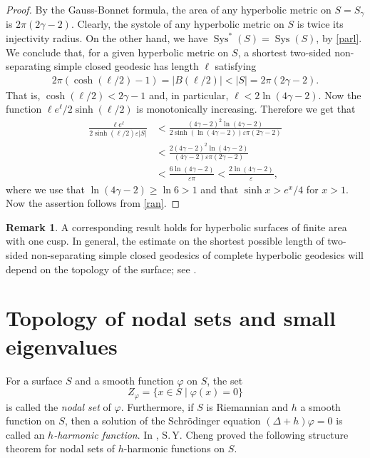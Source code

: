 \documentclass[a4paper,11pt]{amsart}
\numberwithin{equation}{section}
\theoremstyle{definition}
\newtheorem{rem}[equation]{Remark}
\def\ve{\varepsilon}
\def\vf{\varphi}
\DeclareMathOperator{\Sys}{Sys}
\begin{document}
\begin{proof}
By the Gauss-Bonnet formula, the area of any hyperbolic metric on $S=S_\gamma$ is $2\pi(2\gamma-2)$.
Clearly, the systole of any hyperbolic metric on $S$ is twice its injectivity radius.
On the other hand, we have $\Sys^*(S)=\Sys(S)$, by \cref{parl}.
We conclude that, for a given hyperbolic metric on $S$, a shortest two-sided non-separating simple closed geodesic has length $\ell$ satisfying
\begin{align*}
  2\pi(\cosh(\ell/2)-1) = |B(\ell/2)| < |S| = 2\pi(2\gamma-2).
\end{align*}
That is, $\cosh(\ell/2)<2\gamma-1$ and, in particular, $\ell<2\ln(4\gamma-2)$.
Now the function $\ell e^{\ell}/2\sinh(\ell/2)$ is monotonically increasing.
Therefore we get that
\begin{align*}
  \frac{\ell e^\ell}{2\sinh(\ell/2)\ve|S|}
  &< \frac{(4\gamma-2)^2\ln(4\gamma-2)}{2\sinh(\ln(4\gamma-2))\ve\pi(2\gamma-2)} \\
  &< \frac{2(4\gamma-2)^2\ln(4\gamma-2)}{(4\gamma-2)\ve\pi(2\gamma-2)} \\
  &< \frac{6\ln(4\gamma-2)}{\ve\pi} < \frac{2\ln(4\gamma-2)}{\ve},
\end{align*}
where we use that $\ln(4\gamma-2)\ge\ln6>1$ and that $\sinh x>e^x/4$ for $x>1$.
Now the assertion follows from \cref{ran}.
\end{proof}

\begin{rem}
A corresponding result holds for hyperbolic surfaces of finite area with one cusp.
In general, the estimate on the shortest possible length of two-sided non-separating simple closed geodesics of complete hyperbolic geodesics will depend on the topology of the surface; see \cite{Pa}. 
\end{rem}

\section{Topology of nodal sets and small eigenvalues}
\label{secns}
For a surface $S$ and a smooth function $\vf$ on $S$, the set
\begin{equation*}
  Z_\vf = \{x \in S \mid \varphi(x) =0\}
\end{equation*}
is called the \emph{nodal set} of $\vf$.
Furthermore, if $S$ is Riemannian and $h$ a smooth function on $S$,
then a solution of the Schr\"odinger equation $(\Delta + h)\varphi=0$ is called an \emph{$h$-harmonic function}.
In \cite{Che}, S.\,Y. Cheng proved the following structure theorem for nodal sets of $h$-harmonic functions on $S$.
\end{document}
